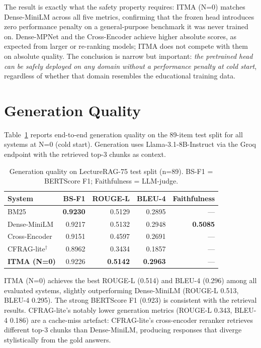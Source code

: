 \documentclass[preprint,12pt]{elsarticle}
\begin{document}
The result is exactly what the safety property requires: ITMA (N=0) matches
Dense-MiniLM across all five metrics, confirming that the frozen head
introduces zero performance penalty on a general-purpose benchmark it was
never trained on.  Dense-MPNet and the Cross-Encoder achieve higher absolute
scores, as expected from larger or re-ranking models; ITMA does not compete
with them on absolute quality.  The conclusion is narrow but important:
\emph{the pretrained head can be safely deployed on any domain without a
performance penalty at cold start}, regardless of whether that domain
resembles the educational training data.

\section{Generation Quality}
\label{sec:generation}

Table~\ref{tab:gen_quality} reports end-to-end generation quality on the
89-item test split for all systems at N=0 (cold start).  Generation uses
Llama-3.1-8B-Instruct via the Groq endpoint with the retrieved top-3 chunks as
context.

\begin{table}[t]
\centering
\small
\caption{Generation quality on LectureRAG-75 test split (n=89).
BS-F1 = BERTScore F1; Faithfulness = LLM-judge.}
\label{tab:gen_quality}
\begin{tabular}{lrrrr}
\toprule
System & BS-F1 & ROUGE-L & BLEU-4 & Faithfulness \\
\midrule
BM25 & \textbf{0.9230} & 0.5129 & 0.2895 & --- \\
Dense-MiniLM & 0.9217 & 0.5132 & 0.2948 & \textbf{0.5085} \\
Cross-Encoder & 0.9151 & 0.4597 & 0.2691 & --- \\
CFRAG-lite$^\dagger$ & 0.8962 & 0.3434 & 0.1857 & --- \\
\textbf{ITMA (N=0)} & 0.9226 & \textbf{0.5142} & \textbf{0.2963} & --- \\
\bottomrule
\end{tabular}
\end{table}

ITMA (N=0) achieves the best ROUGE-L (0.514) and BLEU-4 (0.296) among all
evaluated systems, slightly outperforming Dense-MiniLM (ROUGE-L 0.513,
BLEU-4 0.295).  The strong BERTScore F1 (0.923) is consistent with the
retrieval results.  CFRAG-lite's notably lower generation metrics (ROUGE-L
0.343, BLEU-4 0.186) are a cache-miss artefact: CFRAG-lite's cross-encoder
reranker retrieves different top-3 chunks than Dense-MiniLM, producing responses
that diverge stylistically from the gold answers.
\end{document}
